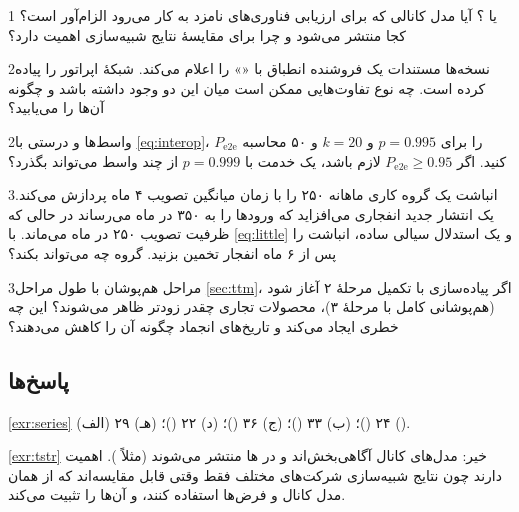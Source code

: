 \documentclass[11pt,a4paper]{article}
\begin{document}
\begin{exercisebox}{1}{ یا ؟}\label{exr:tstr}
آیا مدل کانالی که برای ارزیابی فناوری‌های نامزد به کار می‌رود الزام‌آور است؟ کجا منتشر می‌شود و چرا برای مقایسهٔ نتایج
شبیه‌سازی اهمیت دارد؟
\end{exercisebox}

\begin{exercisebox}{2}{نسخه‌ها}\label{exr:version}
مستندات یک فروشنده انطباق با «» را اعلام می‌کند. شبکهٔ اپراتور  را پیاده کرده است. چه
نوع تفاوت‌هایی ممکن است میان این دو وجود داشته باشد و چگونه آن‌ها را می‌یابید؟
\end{exercisebox}

\begin{exercisebox}{2}{واسط‌ها و درستی}\label{exr:interop}
با \cref{eq:interop}، $P_{\mathrm{e2e}}$ را برای $p = 0.995$ و $k = 20$ و ۵۰ محاسبه کنید. اگر $P_{\mathrm{e2e}} \ge 0.95$ لازم باشد،
یک خدمت با $p = 0.999$ از چند واسط می‌تواند بگذرد؟
\end{exercisebox}

\begin{exercisebox}{3}{انباشت}\label{exr:backlog}
یک گروه کاری ماهانه ۲۵۰  را با زمان میانگین تصویب ۴ ماه پردازش می‌کند. یک انتشار جدید انفجاری می‌افزاید که ورودها
را به ۳۵۰ در ماه می‌رساند در حالی که ظرفیت تصویب ۲۵۰ در ماه می‌ماند. با \cref{eq:little} و یک استدلال سیالی ساده، انباشت
را پس از ۶ ماه انفجار تخمین بزنید. گروه چه می‌تواند بکند؟
\end{exercisebox}

\begin{exercisebox}{3}{مراحل هم‌پوشان}\label{exr:ttm}
با طول مراحل \cref{sec:ttm}، اگر پیاده‌سازی با تکمیل مرحلهٔ ۲ آغاز شود (هم‌پوشانی کامل با مرحلهٔ ۳)، محصولات تجاری چقدر زودتر
ظاهر می‌شوند؟ این چه خطری ایجاد می‌کند و تاریخ‌های انجماد چگونه آن را کاهش می‌دهند؟
\end{exercisebox}

\subsection*{پاسخ‌ها}

\begin{solutionbox}{\ref{exr:series}}
(الف) ۲۴ ()؛ (ب) ۳۳ ()؛ (ج) ۳۶ ()؛ (د) ۲۲ ()؛ (هـ) ۲۹ ().
\end{solutionbox}

\begin{solutionbox}{\ref{exr:tstr}}
خیر: مدل‌های کانال آگاهی‌بخش‌اند و در ها منتشر می‌شوند (مثلاً ). اهمیت دارند چون نتایج شبیه‌سازی
شرکت‌های مختلف فقط وقتی قابل مقایسه‌اند که از همان مدل کانال و فرض‌ها استفاده کنند، و  آن‌ها را تثبیت می‌کند.
\end{solutionbox}
\end{document}
